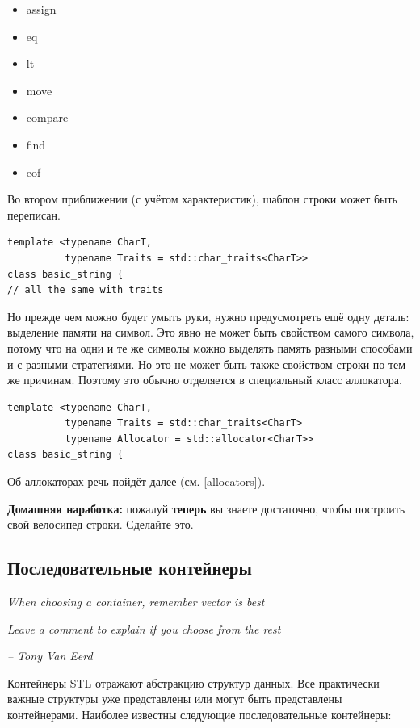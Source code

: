 \documentclass[a4paper,12pt,oneside]{article}
\begin{document}
\begin{itemize}
\item assign
\item eq
\item lt
\item move
\item compare
\item find
\item eof
\end{itemize}

Во втором приближении (с учётом характеристик), шаблон строки может быть переписан.

\begin{lstlisting}
template <typename CharT,
          typename Traits = std::char_traits<CharT>> 
class basic_string {
// all the same with traits
\end{lstlisting}

Но прежде чем можно будет умыть руки, нужно предусмотреть ещё одну деталь: выделение памяти на символ. Это явно не может быть свойством самого символа, потому что на одни и те же символы можно выделять память разными способами и с разными стратегиями. Но это не может быть также свойством строки по тем же причинам. Поэтому это обычно отделяется в специальный класс аллокатора.

\begin{lstlisting}
template <typename CharT,
          typename Traits = std::char_traits<CharT>
          typename Allocator = std::allocator<CharT>> 
class basic_string {
\end{lstlisting}

Об аллокаторах речь пойдёт далее (см. \ref{allocators}).

\textbf{Домашняя наработка:} пожалуй \textbf{теперь} вы знаете достаточно, чтобы построить свой велосипед строки. Сделайте это.

\pagebreak
\subsection{Последовательные контейнеры}\label{SeqContainers}

\hfill\textit{When choosing a container, remember vector is best}

\hfill\textit{Leave a comment to explain if you choose from the rest}{\vspace{0.5em}}

\hfill\textit{-- Tony Van Eerd}

Контейнеры STL отражают абстракцию структур данных. Все практически важные структуры уже представлены или могут быть представлены контейнерами. Наиболее известны следующие последовательные контейнеры:
\end{document}
